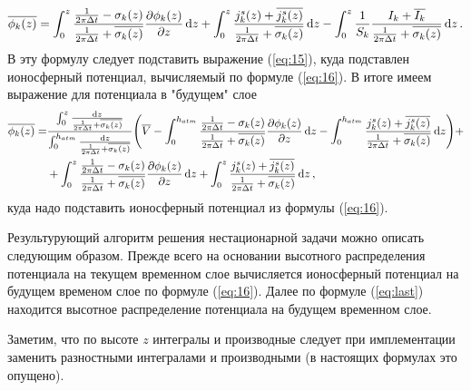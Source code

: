 \documentclass[12pt]{article}
\begin{document}
	\begin{equation}
		{\overline{\phi_k(z)}} = \int_{0}^{z} \dfrac{\frac{1}{2\pi \Delta t} - \sigma_k(z)}{\frac{1}{2\pi \Delta t} + \overline{\sigma_k(z)}} \pdv{\phi_k(z)}{z} \dd{z} + \int_{0}^{z} \dfrac{j^s_k (z) + \overline{j^s_k (z)}}{\frac{1}{2\pi \Delta t} + \overline{\sigma_k(z)}} \dd{z} - \int_{0}^{z} \dfrac{1}{S_k} \dfrac{I_k + \overline{I_k}}{\frac{1}{2\pi \Delta t} + \overline{\sigma_k(z)}} \dd{z}.
	\end{equation}
	В эту формулу следует подставить выражение (\ref{eq:15}), куда подставлен ионосферный потенциал, вычисляемый по формуле (\ref{eq:16}). В итоге имеем выражение для потенциала в "{}будущем"{} слое
	\begin{equation}\label{eq:last}
	\begin{split}
		\overline{\phi_k(z)} = &\dfrac{\int_{0}^{z} \frac{\dd{z}}{\frac{1}{2\pi \Delta t} + \overline{\sigma_k(z)}}}{\int_{0}^{h_{atm}} \frac{\dd{z}}{\frac{1}{2\pi \Delta t} + \overline{\sigma_k(z)}}} \qty(\overline{V} - \int_{0}^{h_{atm}} \dfrac{\frac{1}{2\pi \Delta t} - \sigma_k(z)}{\frac{1}{2\pi \Delta t} + \overline{\sigma_k(z)}} \pdv{\phi_k(z)}{z} \dd{z} - \int_{0}^{h_{atm}} \dfrac{j^s_k (z) + \overline{j^s_k (z)}}{\frac{1}{2\pi \Delta t} + \overline{\sigma_k(z)}} \dd{z})+\\
		& + \int_{0}^{z} \dfrac{\frac{1}{2\pi \Delta t} - \sigma_k(z)}{\frac{1}{2\pi \Delta t} + \overline{\sigma_k(z)}} \pdv{\phi_k(z)}{z} \dd{z} + \int_{0}^{z} \dfrac{j^s_k (z) + \overline{j^s_k (z)}}{\frac{1}{2\pi \Delta t} + \overline{\sigma_k(z)}} \dd{z},
	\end{split}
	\end{equation}
	куда надо подставить ионосферный потенциал из формулы (\ref{eq:16}).
	\par Результурующий алгоритм решения нестационарной задачи можно описать следующим образом. Прежде всего на основании высотного распределения потенциала на текущем временном слое вычисляется ионосферный потенциал на будущем временом слое по формуле (\ref{eq:16}). Далее по формуле (\ref{eq:last}) находится высотное распределение потенциала на будущем временном слое.
	\par Заметим, что по высоте $z$ интегралы и производные следует при имплементации заменить разностными интегралами и производными (в настоящих формулах это опущено). 
\end{document}
